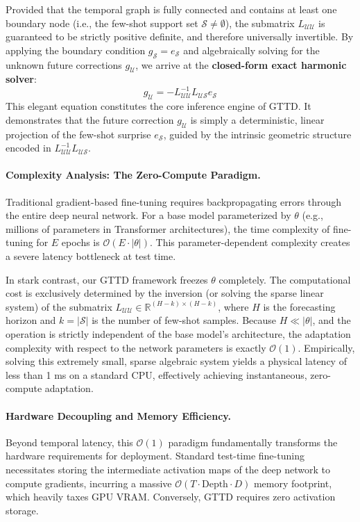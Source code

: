 \documentclass{article}
\begin{document}
Provided that the temporal graph is fully connected and contains at least one boundary node (i.e., the few-shot support set $\mathcal{S} \neq \emptyset$), the submatrix $L_{\mathcal{UU}}$ is guaranteed to be strictly positive definite, and therefore universally invertible. By applying the boundary condition $g_{\mathcal{S}} = e_{\mathcal{S}}$ and algebraically solving for the unknown future corrections $g_{\mathcal{U}}$, we arrive at the \textbf{closed-form exact harmonic solver}:
\begin{equation}
    g_{\mathcal{U}} = -L_{\mathcal{UU}}^{-1} L_{\mathcal{US}} e_{\mathcal{S}}
\end{equation}
This elegant equation constitutes the core inference engine of GTTD. It demonstrates that the future correction $g_{\mathcal{U}}$ is simply a deterministic, linear projection of the few-shot surprise $e_{\mathcal{S}}$, guided by the intrinsic geometric structure encoded in $L_{\mathcal{UU}}^{-1} L_{\mathcal{US}}$.

\paragraph{Complexity Analysis: The Zero-Compute Paradigm.} Traditional gradient-based fine-tuning requires backpropagating errors through the entire deep neural network. For a base model parameterized by $\theta$ (e.g., millions of parameters in Transformer architectures), the time complexity of fine-tuning for $E$ epochs is $\mathcal{O}(E \cdot |\theta|)$. This parameter-dependent complexity creates a severe latency bottleneck at test time.

In stark contrast, our GTTD framework freezes $\theta$ completely. The computational cost is exclusively determined by the inversion (or solving the sparse linear system) of the submatrix $L_{\mathcal{UU}} \in \mathbb{R}^{(H-k) \times (H-k)}$, where $H$ is the forecasting horizon and $k = |\mathcal{S}|$ is the number of few-shot samples. Because $H \ll |\theta|$, and the operation is strictly independent of the base model's architecture, the adaptation complexity with respect to the network parameters is exactly $\mathcal{O}(1)$. Empirically, solving this extremely small, sparse algebraic system yields a physical latency of less than 1 ms on a standard CPU, effectively achieving instantaneous, zero-compute adaptation.

\paragraph{Hardware Decoupling and Memory Efficiency.} Beyond temporal latency, this $\mathcal{O}(1)$ paradigm fundamentally transforms the hardware requirements for deployment. Standard test-time fine-tuning necessitates storing the intermediate activation maps of the deep network to compute gradients, incurring a massive $\mathcal{O}(T \cdot \text{Depth} \cdot D)$ memory footprint, which heavily taxes GPU VRAM. Conversely, GTTD requires zero activation storage. 
\end{document}
